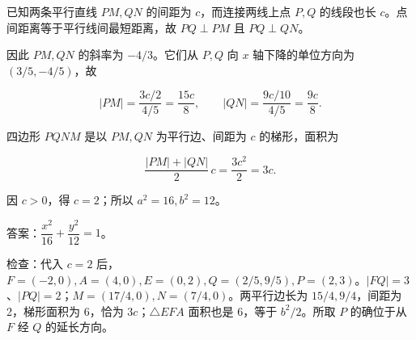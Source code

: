 \begin{answer}
已知两条平行直线 $PM,QN$ 的间距为 $c$，而连接两线上点 $P,Q$ 的线段也长 $c$。点间距离等于平行线间最短距离，故 $PQ\perp PM$ 且 $PQ\perp QN$。

因此 $PM,QN$ 的斜率为 $-4/3$。它们从 $P,Q$ 向 $x$ 轴下降的单位方向为 $(3/5,-4/5)$，故

\nopagebreak[4]
\[|PM|=\frac{3c/2}{4/5}=\frac{15c}{8},\qquad |QN|=\frac{9c/10}{4/5}=\frac{9c}{8}.\]

四边形 $PQNM$ 是以 $PM,QN$ 为平行边、间距为 $c$ 的梯形，面积为

\nopagebreak[4]
\[\frac{|PM|+|QN|}{2}\,c=\frac{3c^2}{2}=3c.\]

因 $c>0$，得 $c=2$；所以 $a^2=16,b^2=12$。

答案：$\boxed{\dfrac{x^2}{16}+\dfrac{y^2}{12}=1}$。

检查：代入 $c=2$ 后，$F=(-2,0),A=(4,0),E=(0,2),Q=(2/5,9/5),P=(2,3)$。$|FQ|=3$、$|PQ|=2$；$M=(17/4,0),N=(7/4,0)$。两平行边长为 $15/4,9/4$，间距为 2，梯形面积为 6，恰为 $3c$；$\triangle EFA$ 面积也是 6，等于 $b^2/2$。所取 $P$ 的确位于从 $F$ 经 $Q$ 的延长方向。



\end{answer}